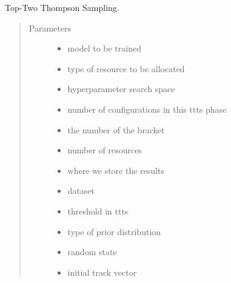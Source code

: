 \documentclass[letterpaper,10pt,english]{sphinxmanual}
\begin{document}
\begin{fulllineitems}
\label{\detokenize{index:heuristics.ttts.ttts}}
Top-Two Thompson Sampling.
\begin{quote}\begin{description}
\item[{Parameters}] \leavevmode\begin{itemize}
\item {} 
 \textendash{} model to be trained

\item {} 
 \textendash{} type of resource to be allocated

\item {} 
 \textendash{} hyperparameter search space

\item {} 
 \textendash{} number of configurations in this ttts phase

\item {} 
 \textendash{} the number of the bracket

\item {} 
 \textendash{} number of resources

\item {} 
 \textendash{} where we store the results

\item {} 
 \textendash{} dataset

\item {} 
 \textendash{} threshold in ttts

\item {} 
 \textendash{} type of prior distribution

\item {} 
 \textendash{} random state

\item {} 
 \textendash{} initial track vector


\end{itemize}
\end{description}
\end{quote}
\end{fulllineitems}
\end{document}
